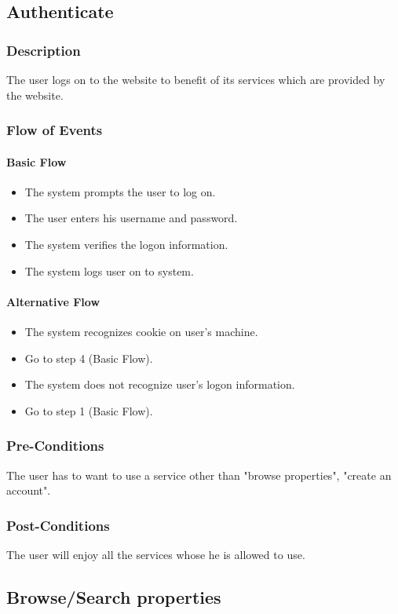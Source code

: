\documentclass[a4paper,12pt]{article}
\begin{document}
\subsection{Authenticate}
\subsubsection{Description}
The user logs on to the website to benefit of its services which are provided by the website.
\subsubsection{Flow of Events}
\paragraph{Basic Flow}
\begin{itemize}
\item The system prompts the user to log on.
\item The user enters his username and password.
\item The system verifies the logon information.
\item The system logs user on to system.
\end{itemize}
\paragraph{Alternative Flow}
\begin{itemize}
\item The system recognizes cookie on user's machine. 
\item Go to step 4 (Basic Flow).
\item The system does not recognize user's logon information.
\item Go to step 1 (Basic Flow).
\end{itemize}
\subsubsection{Pre-Conditions}
The user has to want to use a service other than "browse properties", "create an account".
\subsubsection{Post-Conditions}
The user will enjoy all the services whose he is allowed to use.

\subsection{Browse/Search properties}
\end{document}
